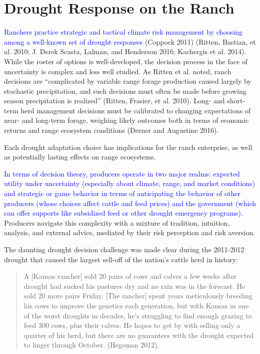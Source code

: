\documentclass[11pt]{article}
\begin{document}
\section{Drought Response on the Ranch}
\textcolor{blue}{Ranchers practice strategic and tactical climate risk management by choosing among a well-known set of drought responses} (Coppock 2011) (Ritten, Bastian, et al. 2010; J. Derek Scasta, Lalman, and Henderson 2016; Kachergis et al. 2014). While the roster of options is well-developed, the decision process in the face of uncertainty is complex and less well studied. As Ritten et al. noted, ranch decisions are “complicated by variable range forage production caused largely by stochastic precipitation, and such decisions must often be made before growing season precipitation is realized” (Ritten, Frasier, et al. 2010). Long- and short-term herd management decisions must be calibrated to changing expectations of near- and long-term forage, weighing likely outcomes both in terms of economic returns and range ecosystem conditions (Derner and Augustine 2016).

Each drought adaptation choice has implications for the ranch enterprise, as well as potentially lasting effects on range ecosystems. 

\textcolor{blue}{In terms of decision theory, producers operate in two major realms: expected utility under uncertainty (especially about climate, range, and market conditions) and strategic or game behavior in terms of anticipating the behavior of other producers (whose choices affect cattle and feed prices) and the government (which can offer supports like subsidized feed or other drought emergency programs).} Producers navigate this complexity with a mixture of tradition, intuition, analysis, and external advice, mediated by their risk perception and risk aversion. 

The daunting drought decision challenge was made clear during the 2011-2012 drought that caused the largest sell-off of the nation’s cattle herd in history:

\begin{quote}
A [Kansas rancher] sold 20 pairs of cows and calves a few weeks after drought had sucked his pastures dry and no rain was in the forecast. He sold 20 more pairs Friday. [The rancher] spent years meticulously breeding his cows to improve the genetics each generation, but with Kansas in one of the worst droughts in decades, he’s struggling to find enough grazing to feed 300 cows, plus their calves. He hopes to get by with selling only a quarter of his herd, but there are no guarantees with the drought expected to linger through October. (Hegeman 2012).
\end{quote}
\end{document}
